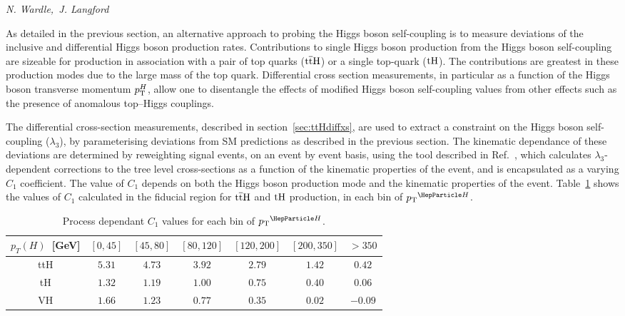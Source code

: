 \begin{center}
\textit{N. Wardle,~J. Langford}
\end{center}


As detailed in the previous section, an alternative approach to probing the Higgs boson self-coupling is to measure deviations of the inclusive and differential Higgs boson production rates. Contributions to single Higgs boson production from the Higgs boson self-coupling are sizeable for production in association with a pair of top quarks ($\text{t}\overline{\text{t}}\text{H}$) or a single top-quark ($\text{tH}$). The contributions are  greatest in these production modes due to the large mass of the top quark. Differential cross section measurements, in particular as a function of the Higgs boson 
transverse momentum $p\sb{\scriptstyle\mathrm{T}}^{H}$, allow one to disentangle the effects of modified Higgs boson self-coupling values from 
other effects such as the presence of anomalous top--Higgs couplings.  



The differential cross-section measurements, described in section~\ref{sec:ttHdiffxs}, 
are used to extract a 
constraint on the Higgs boson self-coupling ($\lambda_{3}$), by parameterising deviations from SM predictions as described in the previous section. The kinematic dependance of these deviations are determined by reweighting signal events, on an event by event basis, using the tool described in Ref.~\cite{EWreweightingtool}, which calculates $\lambda_3$-dependent corrections to the tree level cross-sections as a function of the kinematic properties of the event, and is encapsulated as a 
varying $C_{1}$ coefficient. The value of $C_{1}$ depends on both the Higgs boson production mode and the kinematic properties of the event. Table~\ref{tab:ttHdiff_CMS_c1_values} shows the values of $C_1$ calculated in the fiducial region for $\text{t}\overline{\text{t}}\text{H}$ and $\text{tH}$ production, in each bin of $\pTH$.

\begin{table}[t!]
\begin{center}
\begin{tabular}{|c |c| c| c| c| c| c|}
\hline
   $p_T(H)$~[GeV] & $[0, 45]$  & $[45, 80]$ & $[80, 120]$ & $[120, 200]$ &  $[200, 350]$ &  $>350$ \\ 
\hline
\hline
ttH & $5.31$ & $4.73$ & $3.92$ & $2.79$ & $1.42$ & $0.42$ \\
\hline
tH & $1.32$ &$1.19$ & $1.00$ & $0.75$ & $0.40$ & $0.06$ \\
\hline 
VH & $1.66$ & $1.23$ & $0.77$ & $0.35$ & $0.02$ & $-0.09$ \\
\hline
\end{tabular}
 \caption{Process dependant $C_{1}$ values for each bin of $\pTH$.}
\label{tab:ttHdiff_CMS_c1_values}
\end{center}
\end{table}


